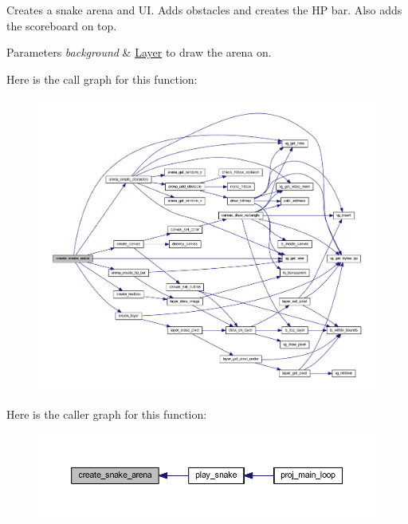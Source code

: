 Creates a snake arena and UI. Adds obstacles and creates the HP bar. Also adds the scoreboard on top. 


\begin{DoxyParams}{Parameters}
{\em background} & \mbox{\hyperlink{struct_layer}{Layer}} to draw the arena on. \\
\hline
\end{DoxyParams}
Here is the call graph for this function\+:\nopagebreak
\begin{figure}[H]
\begin{center}
\leavevmode
\includegraphics[width=350pt]{group__snake_gae7016570a88c488abe2dabb31467daf8_cgraph}
\end{center}
\end{figure}
Here is the caller graph for this function\+:\nopagebreak
\begin{figure}[H]
\begin{center}
\leavevmode
\includegraphics[width=350pt]{group__snake_gae7016570a88c488abe2dabb31467daf8_icgraph}
\end{center}
\end{figure}
\mbox{\label{group__snake_ga66cce1d887c5e9e6cfb8e3d1f76ef9a9}} 
